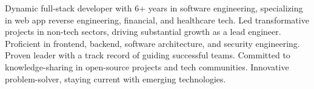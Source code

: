 

\begin{cvparagraph}

Dynamic full-stack developer with 6+ years in software engineering, specializing in web app reverse engineering, financial, and healthcare tech. Led transformative projects in non-tech sectors, driving substantial growth as a lead engineer. Proficient in frontend, backend, software architecture, and security engineering. Proven leader with a track record of guiding successful teams. Committed to knowledge-sharing in open-source projects and tech communities. Innovative problem-solver, staying current with emerging technologies.
\end{cvparagraph}
